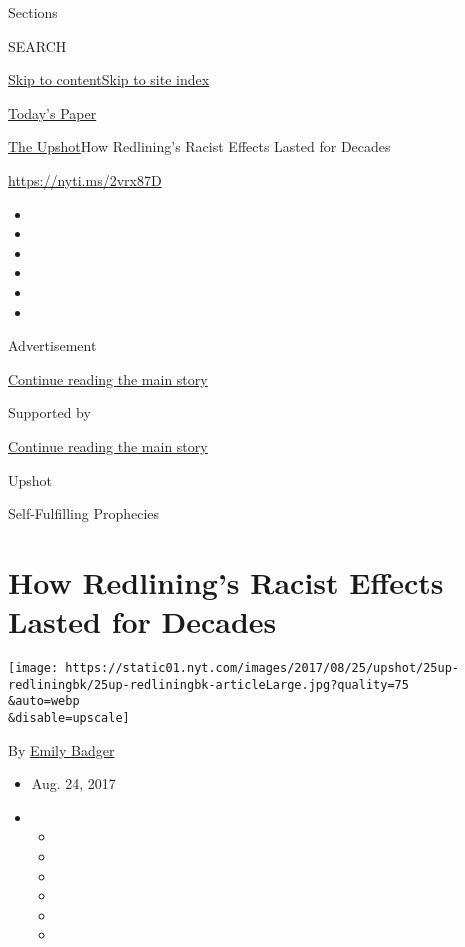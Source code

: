 Sections

SEARCH

\protect\hyperlink{site-content}{Skip to
content}\protect\hyperlink{site-index}{Skip to site index}

\href{https://myaccount.nytimes.com/auth/login?response_type=cookie\&client_id=vi}{}

\href{https://www.nytimes.com/section/todayspaper}{Today's Paper}

\href{/section/upshot}{The Upshot}\textbar{}How Redlining's Racist
Effects Lasted for Decades

\url{https://nyti.ms/2vrx87D}

\begin{itemize}
\item
\item
\item
\item
\item
\item
\end{itemize}

Advertisement

\protect\hyperlink{after-top}{Continue reading the main story}

Supported by

\protect\hyperlink{after-sponsor}{Continue reading the main story}

Upshot

Self-Fulfilling Prophecies

\hypertarget{how-redlinings-racist-effects-lasted-for-decades}{%
\section{How Redlining's Racist Effects Lasted for
Decades}\label{how-redlinings-racist-effects-lasted-for-decades}}

\texttt{[image: https://static01.nyt.com/images/2017/08/25/upshot/25up-redliningbk/25up-redliningbk-articleLarge.jpg?quality=75\\\&auto=webp\\\&disable=upscale]}

By \href{https://www.nytimes.com/by/emily-badger}{Emily Badger}

\begin{itemize}
\item
  Aug. 24, 2017
\item
  \begin{itemize}
  \item
  \item
  \item
  \item
  \item
  \item
  \end{itemize}
\end{itemize}

